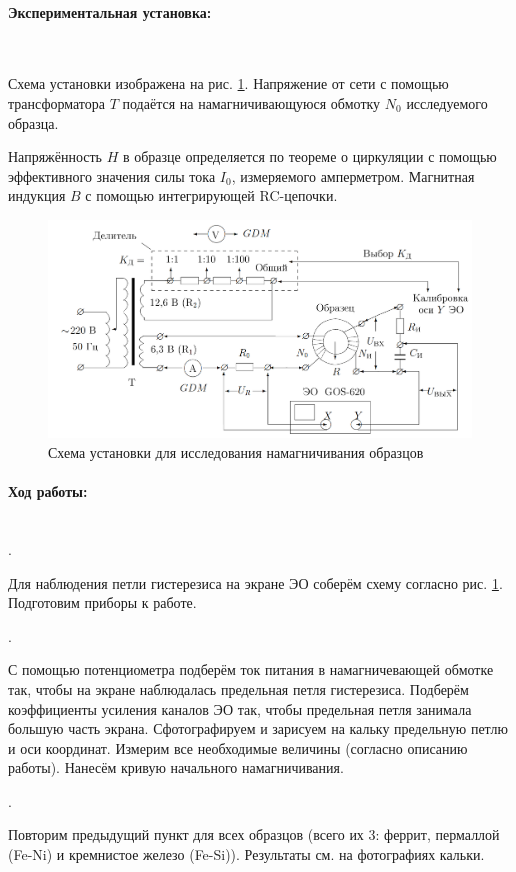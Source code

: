 \documentclass[a4paper, 12pt]{article}
\newcommand{\parag}[1]{\paragraph*{#1:}}
\newcounter{Points}
\newcommand{\point}{\arabic{Points}. \addtocounter{Points}{1}}
\begin{document}
\parag {Экспериментальная установка} ~

Схема установки изображена на рис. \ref{workplace}. Напряжение от сети с помощью трансформатора $T$ подаётся на намагничивающуюся обмотку $N_0$ исследуемого образца.

Напряжённость $H$ в образце определяется по теореме о циркуляции с помощью эффективного значения силы тока $I_0$, измеряемого амперметром. Магнитная индукция $B$ с помощью интегрирующей RC-цепочки.

\begin{figure}[!h]
    \includegraphics[scale = 0.2]{Workplace}
    \centering
    \caption{Схема установки для исследования намагничивания образцов}
    \label{workplace}
\end{figure}

\parag {Ход работы} ~\\

\point Для наблюдения петли гистерезиса на экране ЭО соберём схему согласно рис. \ref{workplace}. Подготовим приборы к работе. 

\point С помощью потенциометра подберём ток питания в намагничевающей обмотке так, чтобы на экране наблюдалась предельная петля гистерезиса. Подберём коэффициенты усиления каналов ЭО так, чтобы предельная петля занимала большую часть экрана. Сфотографируем и зарисуем на кальку предельную петлю и оси координат. Измерим все необходимые величины (согласно описанию работы). Нанесём кривую начального намагничивания.

\point Повторим предыдущий пункт для всех образцов (всего их 3: феррит, пермаллой (Fe-Ni) и кремнистое железо (Fe-Si)). Результаты см. на фотографиях кальки.
\end{document}
